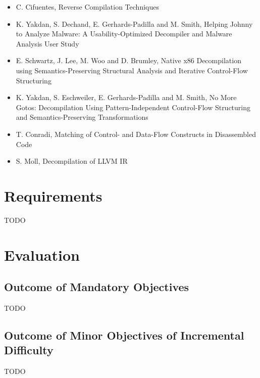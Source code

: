 \documentclass[12pt, a4paper]{article}
\begin{document}
\begin{itemize}
	\item C. Cifuentes, Reverse Compilation Techniques \cite{cifuentes_reverse_comp}
	\item K. Yakdan, S. Dechand, E. Gerhards-Padilla and M. Smith, Helping Johnny to Analyze Malware: A Usability-Optimized Decompiler and Malware Analysis User Study \cite{helping_johnny}
	\item E. Schwartz, J. Lee, M. Woo and D. Brumley, Native x86 Decompilation using Semantics-Preserving Structural Analysis and Iterative Control-Flow Structuring \cite{semantics_preserving_structural_analysis}
	\item K. Yakdan, S. Eschweiler, E. Gerhards-Padilla and M. Smith, No More Gotos: Decompilation Using Pattern-Independent Control-Flow Structuring and Semantics-Preserving Transformations \cite{no_more_gotos}
	\item T. Conradi, Matching of Control- and Data-Flow Constructs in Disassembled Code \cite{pdg_control_flow_analysis}
	\item S. Moll, Decompilation of LLVM IR \cite{node_splitting}
\end{itemize}

\clearpage

\section{Requirements}

TODO

\clearpage

\section{Evaluation}

\subsection{Outcome of Mandatory Objectives}

TODO

\subsection{Outcome of Minor Objectives of Incremental Difficulty}

TODO
\end{document}
